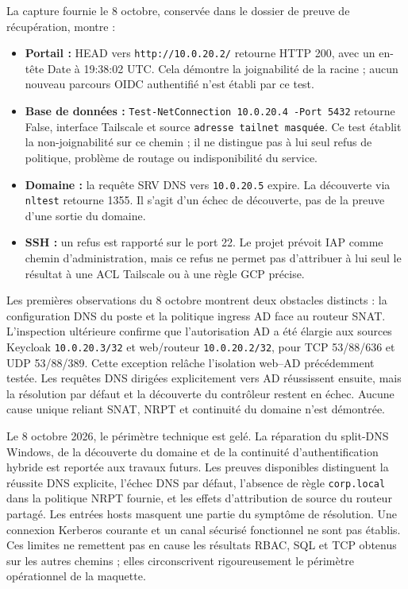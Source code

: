 \documentclass[a4paper,12pt]{report}
\begin{document}
La capture fournie le 8 octobre, conservée dans le dossier de preuve de récupération, montre :
\begin{itemize}
\item \textbf{Portail :} HEAD vers \texttt{http://10.0.20.2/} retourne HTTP 200, avec un en-tête Date à 19:38:02 UTC. Cela démontre la joignabilité de la racine ; aucun nouveau parcours OIDC authentifié n'est établi par ce test.
\item \textbf{Base de données :} \texttt{Test-NetConnection 10.0.20.4 -Port 5432} retourne False, interface Tailscale et source \texttt{adresse tailnet masquée}. Ce test établit la non-joignabilité sur ce chemin ; il ne distingue pas à lui seul refus de politique, problème de routage ou indisponibilité du service.
\item \textbf{Domaine :} la requête SRV DNS vers \texttt{10.0.20.5} expire. La découverte via \texttt{nltest} retourne 1355. Il s'agit d'un échec de découverte, pas de la preuve d'une sortie du domaine.
\item \textbf{SSH :} un refus est rapporté sur le port 22. Le projet prévoit IAP comme chemin d'administration, mais ce refus ne permet pas d'attribuer à lui seul le résultat à une ACL Tailscale ou à une règle GCP précise.
\end{itemize}
Les premières observations du 8 octobre montrent deux obstacles distincts : la configuration DNS du poste et la politique ingress AD face au routeur SNAT. L'inspection ultérieure confirme que l'autorisation AD a été élargie aux sources Keycloak \texttt{10.0.20.3/32} et web/routeur \texttt{10.0.20.2/32}, pour TCP 53/88/636 et UDP 53/88/389. Cette exception relâche l'isolation web--AD précédemment testée. Les requêtes DNS dirigées explicitement vers AD réussissent ensuite, mais la résolution par défaut et la découverte du contrôleur restent en échec. Aucune cause unique reliant SNAT, NRPT et continuité du domaine n'est démontrée.

Le 8 octobre 2026, le périmètre technique est gelé. La réparation du split-DNS Windows, de la découverte du domaine et de la continuité d'authentification hybride est reportée aux travaux futurs. Les preuves disponibles distinguent la réussite DNS explicite, l'échec DNS par défaut, l'absence de règle \texttt{corp.local} dans la politique NRPT fournie, et les effets d'attribution de source du routeur partagé. Les entrées hosts masquent une partie du symptôme de résolution. Une connexion Kerberos courante et un canal sécurisé fonctionnel ne sont pas établis. Ces limites ne remettent pas en cause les résultats RBAC, SQL et TCP obtenus sur les autres chemins ; elles circonscrivent rigoureusement le périmètre opérationnel de la maquette.
\end{document}
